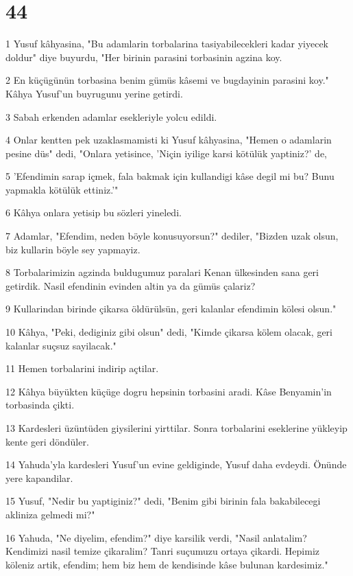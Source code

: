 \chapter{44}

\par 1 Yusuf kâhyasina, "Bu adamlarin torbalarina tasiyabilecekleri kadar yiyecek doldur" diye buyurdu, "Her birinin parasini torbasinin agzina koy.
\par 2 En küçügünün torbasina benim gümüs kâsemi ve bugdayinin parasini koy." Kâhya Yusuf'un buyrugunu yerine getirdi.
\par 3 Sabah erkenden adamlar esekleriyle yolcu edildi.
\par 4 Onlar kentten pek uzaklasmamisti ki Yusuf kâhyasina, "Hemen o adamlarin pesine düs" dedi, "Onlara yetisince, 'Niçin iyilige karsi kötülük yaptiniz?' de,
\par 5 'Efendimin sarap içmek, fala bakmak için kullandigi kâse degil mi bu? Bunu yapmakla kötülük ettiniz.'"
\par 6 Kâhya onlara yetisip bu sözleri yineledi.
\par 7 Adamlar, "Efendim, neden böyle konusuyorsun?" dediler, "Bizden uzak olsun, biz kullarin böyle sey yapmayiz.
\par 8 Torbalarimizin agzinda buldugumuz paralari Kenan ülkesinden sana geri getirdik. Nasil efendinin evinden altin ya da gümüs çalariz?
\par 9 Kullarindan birinde çikarsa öldürülsün, geri kalanlar efendimin kölesi olsun."
\par 10 Kâhya, "Peki, dediginiz gibi olsun" dedi, "Kimde çikarsa kölem olacak, geri kalanlar suçsuz sayilacak."
\par 11 Hemen torbalarini indirip açtilar.
\par 12 Kâhya büyükten küçüge dogru hepsinin torbasini aradi. Kâse Benyamin'in torbasinda çikti.
\par 13 Kardesleri üzüntüden giysilerini yirttilar. Sonra torbalarini eseklerine yükleyip kente geri döndüler.
\par 14 Yahuda'yla kardesleri Yusuf'un evine geldiginde, Yusuf daha evdeydi. Önünde yere kapandilar.
\par 15 Yusuf, "Nedir bu yaptiginiz?" dedi, "Benim gibi birinin fala bakabilecegi akliniza gelmedi mi?"
\par 16 Yahuda, "Ne diyelim, efendim?" diye karsilik verdi, "Nasil anlatalim? Kendimizi nasil temize çikaralim? Tanri suçumuzu ortaya çikardi. Hepimiz köleniz artik, efendim; hem biz hem de kendisinde kâse bulunan kardesimiz."
